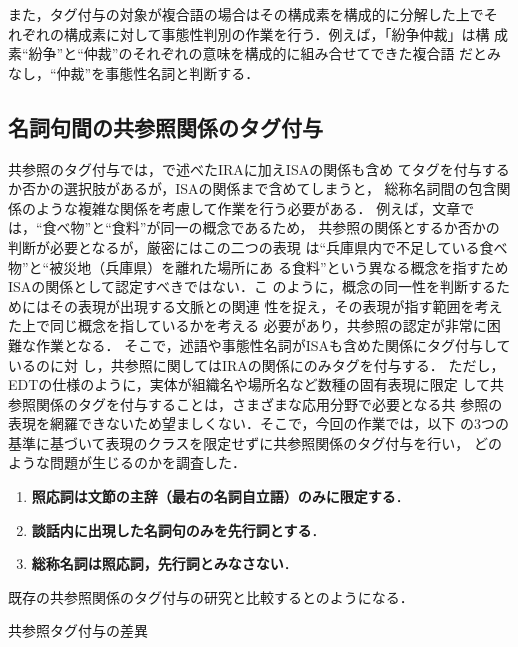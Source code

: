 \documentclass[japanese]{jnlp_1.4}
\def\sec#1{}
\def\tab#1{}
\begin{document}
また，タグ付与の対象が複合語の場合はその構成素を構成的に分解した上でそ
れぞれの構成素に対して事態性判別の作業を行う．例えば，「紛争仲裁」は構
成素``紛争''と``仲裁''のそれぞれの意味を構成的に組み合せてできた複合語
だとみなし，``仲裁''を事態性名詞と判断する．


\subsection{名詞句間の共参照関係のタグ付与}
\label{ssec:spec_coref}

共参照のタグ付与では，\sec{second}で述べたIRAに加えISAの関係も含め
てタグを付与するか否かの選択肢があるが，ISAの関係まで含めてしまうと，
総称名詞間の包含関係のような複雑な関係を考慮して作業を行う必要がある．
例えば，文章では，``食べ物''と``食料''が同一の概念であるため，
共参照の関係とするか否かの判断が必要となるが，厳密にはこの二つの表現
は\mbox{``兵}庫県内で不足している食べ物''と``被災地（兵庫県）を離れた場所にあ
る食料''という異なる概念を指すためISAの関係として認定すべきではない．こ
のように，概念の同一性を判断するためにはその表現が出現する文脈との関連
性を捉え，その表現が指す範囲を考えた上で同じ概念を指しているかを考える
必要があり，共参照の認定が非常に困難な作業となる．
そこで，述語や事態性名詞がISAも含めた関係にタグ付与しているのに対
し，共参照に関してはIRAの関係にのみタグを付与する．
ただし，EDTの仕様のように，実体が組織名や場所名など数種の固有表現に限定
して共参照関係のタグを付与することは，さまざまな応用分野で必要となる共
参照の表現を網羅できないため望ましくない．そこで，今回の作業では，以下
の3つの基準に基づいて表現のクラスを限定せずに共参照関係のタグ付与を行い，
どのような問題が生じるのかを調査した．
\begin{enumerate}
\item \textbf{照応詞は文節の主辞（最右の名詞自立語）のみに限定する}．
\item \textbf{談話内に出現した名詞句のみを先行詞とする}．
\item \textbf{総称名詞は照応詞，先行詞とみなさない}．
\end{enumerate}
既存の共参照関係のタグ付与の研究と比較すると\tab{diff_coref}のようになる．

\begin{table}[t]
  \caption{共参照タグ付与の差異}
  \label{tab:diff_coref}

\end{table}
\end{document}
